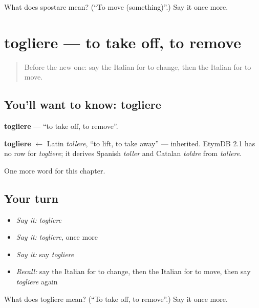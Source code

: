 \begin{tcolorbox}[breakable,colback=teal!4,colframe=teal!35!black,title={Before you move on}]
What does spostare mean? (\textquotedblleft{}To move (something)\textquotedblright{}.) Say it once more.
\end{tcolorbox}
\section[togliere]{togliere — to take off, to remove}

\label{lesson:IT-C234-togliere}



\begin{quote}
Before the new one: say the Italian for to change, then the Italian for to move.
\end{quote}

\subsection*{You'll want to know: togliere}
\textbf{togliere} — \textquotedblleft{}to take off, to remove\textquotedblright{}.

\begin{cousinweb}
\textbf{togliere} $\leftarrow$ Latin \emph{tollere}, \textquotedblleft{}to lift, to take away\textquotedblright{} — inherited. EtymDB 2.1 has no row for \emph{togliere}; it derives Spanish \emph{toller} and Catalan \emph{toldre} from \emph{tollere}.
\end{cousinweb}

\begin{grammarlens}[title={What you've built}]
One more word for this chapter.
\end{grammarlens}

\subsection*{Your turn}
\begin{itemize}
\raggedright
  \item \emph{Say it:} \emph{togliere}
  \item \emph{Say it:} \emph{togliere}, once more
  \item \emph{Say it:} say \emph{togliere}
  \item \emph{Recall:} say the Italian for to change, then the Italian for to move, then say \emph{togliere} again
\end{itemize}

\begin{tcolorbox}[breakable,colback=teal!4,colframe=teal!35!black,title={Before you move on}]
What does togliere mean? (\textquotedblleft{}To take off, to remove\textquotedblright{}.) Say it once more.
\end{tcolorbox}
